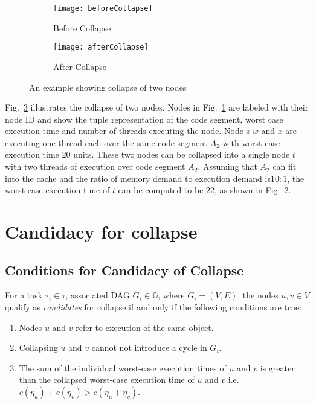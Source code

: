 \begin{figure}
  \centering
  \begin{subfigure}[b]{0.4\textwidth}{
      \texttt{[image: beforeCollapse]}
      \caption{Before Collapse}
      \label{fig:before-collapse}
    }
  \end{subfigure} \quad
  \begin{subfigure}[b]{0.4\textwidth}{
      \texttt{[image: afterCollapse]}
      \caption{After Collapse}
      \label{fig:after-collapse}
    }
  \end{subfigure}
  \caption{An example showing collapse of two nodes}
  \label{fig:dag-collapse}
\end{figure}

Fig.~\ref{fig:dag-collapse} illustrates the collapse of two nodes. Nodes in
Fig.~\ref{fig:before-collapse} are labeled with their node ID and show the tuple representation of the code segment, worst case execution time and number of threads executing the node. Node s $w$ and $x$ are executing one thread each over the same code segment $A_2$ with worst case execution time 20 units. These two nodes can be collapsed into a single node $t$ with two threads of execution over code segment $A_2$. Assuming that $A_2$ can fit into the cache and the ratio of memory demand to execution demand is$10:1$, the worst case execution time of $t$ can be computed to be $22$, as shown in
Fig.~\ref{fig:after-collapse}.

  





\section{Candidacy for collapse}

\subsection{Conditions for Candidacy of Collapse}
For a task ${\tau_i \in \tau}$, associated DAG ${G_i \in \mathbb{G}}$,
where ${G_i = (V, E)}$, the nodes ${u,v \in V}$ qualify as
\emph{candidates} for collapse if and only if the following conditions
are true: 
\begin{enumerate}
  \item Nodes ${u}$ and ${v}$ refer to execution of the same object.
  \item Collapsing ${u}$ and ${v}$ cannot not introduce a cycle in ${G_i}$.
  \item The sum of the individual worst-case execution times of ${u}$
    and ${v}$ is greater than the collapsed worst-case execution time
    of ${u}$ and ${v}$ i.e. ${c(\eta_u) + c(\eta_v) > c(\eta_u + \eta_v)}$.
\end{enumerate}

